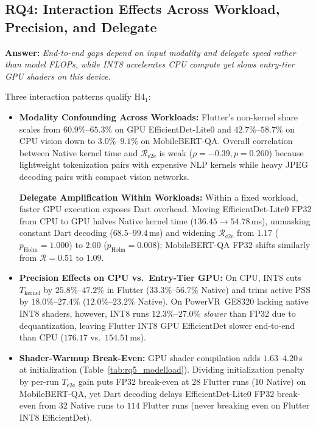 \subsection{RQ4: Interaction Effects Across Workload, Precision, and Delegate}\label{subsec:rq4}
\textbf{Answer:} \textit{End-to-end gaps depend on input modality and delegate speed rather than model FLOPs, while INT8 accelerates CPU compute yet slows entry-tier GPU shaders on this device.}

Three interaction patterns qualify H4$_1$:
\begin{itemize}
    \item \textbf{Modality Confounding Across Workloads:} Flutter's non-kernel share scales from $60.9\%\text{--}65.3\%$ on GPU EfficientDet-Lite0 and $42.7\%\text{--}58.7\%$ on CPU vision down to $3.0\%\text{--}9.1\%$ on MobileBERT-QA. Overall correlation between Native kernel time and $\mathcal{R}_{\mathrm{e2e}}$ is weak ($\rho=-0.39, p=0.260$) because lightweight tokenization pairs with expensive NLP kernels while heavy JPEG decoding pairs with compact vision networks.

    \textbf{Delegate Amplification Within Workloads:} Within a fixed workload, faster GPU execution exposes Dart overhead. Moving EfficientDet-Lite0 FP32 from CPU to GPU halves Native kernel time ($136.45 \to 54.78$\,ms), unmasking constant Dart decoding ($68.5\text{--}99.4$\,ms) and widening $\mathcal{R}_{\mathrm{e2e}}$ from $1.17$ ($p_{\mathrm{Holm}}=1.000$) to $2.00$ ($p_{\mathrm{Holm}}=0.008$); MobileBERT-QA FP32 shifts similarly from $\mathcal{R}=0.51$ to $1.09$.
    \item \textbf{Precision Effects on CPU vs.\ Entry-Tier GPU:} On CPU, INT8 cuts $T_{\mathrm{kernel}}$ by $25.8\%\text{--}47.2\%$ in Flutter ($33.3\%\text{--}56.7\%$ Native) and trims active PSS by $18.0\%\text{--}27.4\%$ ($12.0\%\text{--}23.2\%$ Native). On PowerVR~GE8320 lacking native INT8 shaders, however, INT8 runs $12.3\%\text{--}27.0\%$ \emph{slower} than FP32 due to dequantization, leaving Flutter INT8 GPU EfficientDet slower end-to-end than CPU ($176.17$ vs.\ $154.51$\,ms).
    \item \textbf{Shader-Warmup Break-Even:} GPU shader compilation adds $1.63\text{--}4.20$\,s at initialization (Table~\ref{tab:rq5_modelload}). Dividing initialization penalty by per-run $T_{\mathrm{e2e}}$ gain puts FP32 break-even at $28$ Flutter runs ($10$ Native) on MobileBERT-QA, yet Dart decoding delays EfficientDet-Lite0 FP32 break-even from $32$ Native runs to $114$ Flutter runs (never breaking even on Flutter INT8 EfficientDet).
\end{itemize}


